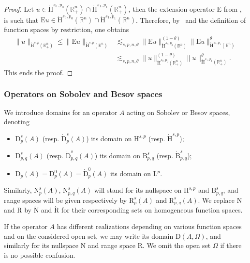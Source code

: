 \documentclass[10pt]{amsart}
\theoremstyle{definition}\newtheorem{defi}[theo]{Definition}\newtheorem{rema}[theo]{Remark}\newtheorem{exam}[theo]{Example}\newtheorem{exem}[theo]{Example}\newtheorem{nota}[theo]{Notation}
\newcommand{\bbR}{\mathbb{R}}
\newcommand{\rmH}{\mathrm{H}}%
\newcommand{\rmB}{\mathrm{B}}
\newcommand{\rmD}{\mathrm{D}}
\newcommand{\rmL}{\mathrm{L}}
\newcommand{\rmR}{\mathrm{R}}
\newcommand{\rmE}{\mathrm{E}}
\newcommand{\rmN}{\mathrm{N}}
\begin{document}
\begin{proof}
Let $u\in \dot{\rmH}^{s_0,p_0}(\bbR^n_+)\cap\dot{\rmH}^{s_1,p_1}(\bbR^n_+)$, then the extension operator $\rmE $ from \cite[Corollary~3.4]{Gaudin2022}, is such that $\rmE u\in \dot{\rmH}^{s_0,p_0}(\bbR^n)\cap\dot{\rmH}^{s_1,p_1}(\bbR^n)$. Therefore, by~\cite[Proposition~2.2~(vii),~Corollary~3.4]{Gaudin2022} and the definition of function spaces by restriction, one obtains
\begin{align*}
\| u \|_{\dot{\rmH}^{s,p}\left(\bbR^n_+\right)} \leqslant \| \rmE u \|_{\dot{\rmH}^{s,p}(\bbR^n)}&\lesssim_{s,p,n,\theta} \| \rmE u \|_{\dot{\rmH}^{s_0,p_0}(\bbR^n)}^{(1-\theta)}\| \rmE u\|_{\dot{\rmH}^{s_1,p_1}(\bbR^n)}^{\theta}\\ &\lesssim_{s,p,n,\theta} \| u \|_{\dot{\rmH}^{s_0,p_0}\left(\bbR^n_+\right)}^{(1-\theta)}\| u \|_{\dot{\rmH}^{s_1,p_1}\left(\bbR^n_+\right)}^{\theta}.
\end{align*}
This ends the proof.
\end{proof}

\subsubsection{Operators on Sobolev and Besov spaces}

We introduce domains for an operator $A$ acting on Sobolev or Besov spaces, denoting
\begin{itemize}
\item $\rmD^{s}_{p}(A)$ (resp. $\dot{\rmD}^{s}_{p}(A)$) its domain on $\rmH^{s,p}$ (resp. $\dot{\rmH}^{s,p}$);
\item $\rmD^{s}_{p,q}(A)$ (resp. $\dot{\rmD}^{s}_{p,q}(A)$) its domain on $\rmB^{s}_{p,q}$ (resp. $\dot{\rmB}^{s}_{p,q}$);
\item $\rmD_{p}(A) = \rmD^{0}_{p}(A) = \dot{\rmD}^{0}_{p}(A)$ its domain on $\rmL^p$.
\end{itemize}

Similarly, $\rmN^{s}_{p}(A)$, $\rmN^{s}_{p,q}(A)$ will stand for its nullspace on $\rmH^{s,p}$ and $\rmB^{s}_{p,q}$, and range spaces will be given respectively by $\rmR^{s}_{p}(A)$ and $\rmR^{s}_{p,q}(A)$. We replace $\rmN$ and $\rmR $ by $\dot{\rmN}$ and $\dot{\rmR}$ for their corresponding sets on homogeneous function spaces.

If the operator $A$ has different realizations depending on various function spaces and on the considered open set, we may write its domain $\rmD(A,\Omega)$, and similarly for its nullspace $\rmN$ and range space $\rmR$. We omit the open set $\Omega$ if there is no possible confusion.
\end{document}

